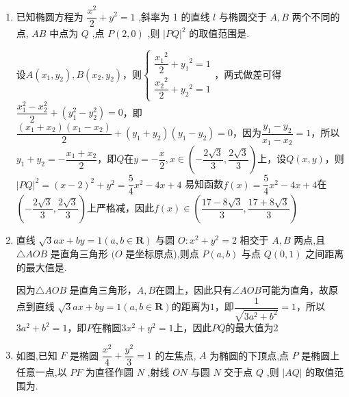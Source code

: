 \begin{enumerate}
\begin{jieda}
        易知椭圆$\sqrt{{x}^{2} + {y}^{2}} + \sqrt{{\left( x - 8\right) }^{2} + {\left( y - 6\right) }^{2}} = {20}$的长轴与直线$3x - {4y} - 100 = 0$平行，故其最大值在椭圆短轴顶点处取到，为椭圆中心到直线距离加短半轴长的和的5倍，为$100+25\sqrt{3}$
    \end{jieda}
    \item 已知椭圆方程为 $\dfrac{{x}^{2}}{2} + {y}^{2} = 1$ ,斜率为 1 的直线 $l$ 与椭圆交于 $A,B$ 两个不同的点, ${AB}$ 中点为 $Q$ ,点 $P\left( {2,0}\right)$ ,则 ${\left| PQ\right| }^{2}$ 的取值范围是.
    \begin{jieda}
        设$A(x_1, y_2), B(x_2, y_2)$，则$\left\{\begin{array}{l}
             \dfrac{{x_1}^{2}}{2} + {y_1}^{2} = 1 \\
             \dfrac{{x_2}^{2}}{2} + {y_2}^{2} = 1 
        \end{array}\right.$，两式做差可得$\dfrac{x_1^2-x_2^2}{2} + (y_1^2-y_2^2) = 0$，即$\dfrac{(x_1+x_2)(x_1-x_2)}{2} + (y_1+y_2)(y_1-y_2) = 0$，因为$\dfrac{y_1-y_2}{x_1-x_2} = 1$，所以$y_1+y_2 = -\dfrac{x_1+x_2}{2}$，即$Q$在$y = -\dfrac{x}{2}, x \in \left(-\dfrac{2\sqrt{3}}{3}, \dfrac{2\sqrt{3}}{3}\right)$上，设$Q(x, y)$，则$|PQ|^2 = (x-2)^2+y^2 = \dfrac{5}{4}x^2-4x+4$
        易知函数$f(x) = \dfrac{5}{4}x^2-4x+4$在$\left(-\dfrac{2\sqrt{3}}{3}, \dfrac{2\sqrt{3}}{3}\right)$上严格减，因此$f(x) \in \left(\dfrac{17-8\sqrt{3}}{3}, \dfrac{17+8\sqrt{3}}{3}\right)$
    \end{jieda}
    \item 直线 $\sqrt{3}{ax} + {by} = 1\left( {a,b \in  \mathbf{R}}\right)$ 与圆 $O : {x}^{2} + {y}^{2} = 2$ 相交于 $A,B$ 两点,且 $\bigtriangleup {AOB}$ 是直角三角形 $(O$ 是坐标原点),则点 $P\left( {a,b}\right)$ 与点 $Q\left( {0,1}\right)$ 之间距离的最大值是.
    \begin{jieda}
        因为$\bigtriangleup {AOB}$ 是直角三角形，$A,B$在圆上，因此只有$\angle{AOB}$可能为直角，故原点到直线 $\sqrt{3}{ax} + {by} = 1\left( {a,b \in  \mathbf{R}}\right)$的距离为$1$，即$\dfrac{1}{\sqrt{3a^2+b^2}} = 1$，所以$3a^2+b^2 = 1$，即$P$在椭圆$3x^2 + y^2 = 1$上，因此$PQ$的最大值为2
    \end{jieda}
    \item 如图,已知 $F$ 是椭圆 $\dfrac{{x}^{2}}{4} + \dfrac{{y}^{2}}{3} = 1$ 的左焦点, $A$ 为椭圆的下顶点,点 $P$ 是椭圆上任意一点,以 ${PF}$ 为直径作圆 $N$ ,射线 ${ON}$ 与圆 $N$ 交于点 $Q$ ,则 $\left| {AQ}\right|$ 的取值范围为.
    

\end{enumerate}
